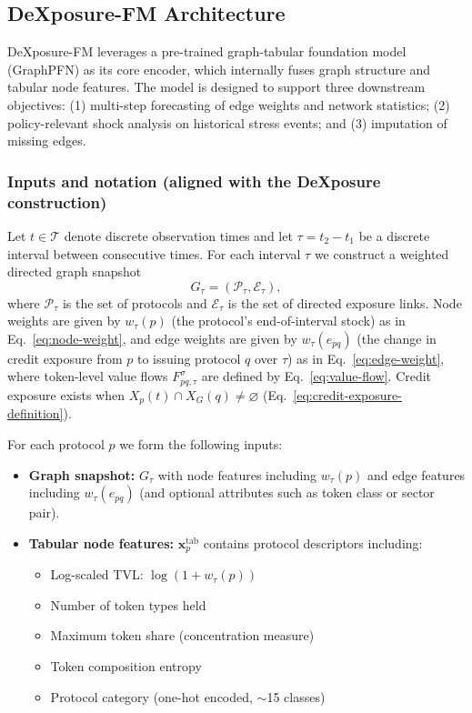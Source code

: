 \documentclass[preprint,12pt]{elsarticle}
\begin{document}
\subsection{DeXposure-FM Architecture}
\label{sec:dexposure-fm-architecture}

DeXposure-FM leverages a pre-trained graph-tabular foundation model (GraphPFN) as its core encoder, which internally fuses graph structure and tabular node features. The model is designed to support three downstream objectives: (1) multi-step forecasting of edge weights and network statistics; (2) policy-relevant shock analysis on historical stress events; and (3) imputation of missing edges.

\subsubsection{Inputs and notation (aligned with the DeXposure construction)}
Let $t\in\mathcal{T}$ denote discrete observation times and let $\tau = t_2-t_1$ be a discrete interval between consecutive times.
For each interval $\tau$ we construct a weighted directed graph snapshot
\begin{equation}
G_{\tau}=(\mathcal{P}_{\tau},\mathcal{E}_{\tau}),
\end{equation}
where $\mathcal{P}_{\tau}$ is the set of protocols and $\mathcal{E}_{\tau}$ is the set of directed exposure links.
Node weights are given by $w_{\tau}(p)$ (the protocol's end-of-interval stock) as in Eq.~\eqref{eq:node-weight}, and edge weights are given by $w_{\tau}(e_{pq})$ (the change in credit exposure from $p$ to issuing protocol $q$ over $\tau$) as in Eq.~\eqref{eq:edge-weight}, where token-level value flows $F^{\sigma}_{pq,\tau}$ are defined by Eq.~\eqref{eq:value-flow}. Credit exposure exists when $X_p(t)\cap X_G(q)\neq\varnothing$ (Eq.~\eqref{eq:credit-exposure-definition}).

For each protocol $p$ we form the following inputs:
\begin{itemize}
  \item \textbf{Graph snapshot:} $G_{\tau}$ with node features including $w_{\tau}(p)$ and edge features including $w_{\tau}(e_{pq})$ (and optional attributes such as token class or sector pair).
  \item \textbf{Tabular node features:} $\mathbf{x}^{\mathrm{tab}}_{p}$ contains protocol descriptors including:
  \begin{itemize}
    \item Log-scaled TVL: $\log(1 + w_{\tau}(p))$
    \item Number of token types held
    \item Maximum token share (concentration measure)
    \item Token composition entropy
    \item Protocol category (one-hot encoded, $\sim$15 classes)
  \end{itemize}
\end{itemize}
\end{document}
